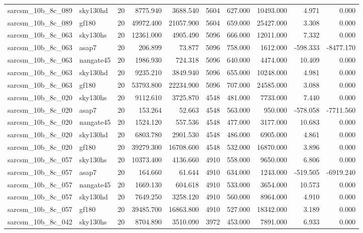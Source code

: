 \documentclass{article}
\begin{document}
\begin{longtable}{llrrrrrrrr}
sarcsm\_10b\_8c\_089 & sky130hd & 20 & 8775.940 & 3688.540 & 5604 & 627.000 & 10493.000 & 4.971 & 0.000 \\
sarcsm\_10b\_8c\_089 & gf180 & 20 & 49972.400 & 21057.900 & 5604 & 659.000 & 25427.000 & 3.308 & 0.000 \\
sarcsm\_10b\_8c\_063 & sky130hs & 20 & 12361.000 & 4905.490 & 5096 & 666.000 & 12011.000 & 7.332 & 0.000 \\
sarcsm\_10b\_8c\_063 & asap7 & 20 & 206.899 & 73.877 & 5096 & 758.000 & 1612.000 & -598.333 & -8477.170 \\
sarcsm\_10b\_8c\_063 & nangate45 & 20 & 1986.930 & 724.318 & 5096 & 640.000 & 4474.000 & 10.409 & 0.000 \\
sarcsm\_10b\_8c\_063 & sky130hd & 20 & 9235.210 & 3849.940 & 5096 & 655.000 & 10248.000 & 4.981 & 0.000 \\
sarcsm\_10b\_8c\_063 & gf180 & 20 & 53793.800 & 22234.900 & 5096 & 707.000 & 24585.000 & 3.088 & 0.000 \\
sarcsm\_10b\_8c\_020 & sky130hs & 20 & 9112.610 & 3725.870 & 4548 & 481.000 & 7733.000 & 7.440 & 0.000 \\
sarcsm\_10b\_8c\_020 & asap7 & 20 & 153.264 & 52.663 & 4548 & 563.000 & 950.000 & -578.058 & -7711.560 \\
sarcsm\_10b\_8c\_020 & nangate45 & 20 & 1524.120 & 557.536 & 4548 & 477.000 & 3177.000 & 10.683 & 0.000 \\
sarcsm\_10b\_8c\_020 & sky130hd & 20 & 6803.780 & 2901.530 & 4548 & 486.000 & 6905.000 & 4.861 & 0.000 \\
sarcsm\_10b\_8c\_020 & gf180 & 20 & 39279.300 & 16708.600 & 4548 & 532.000 & 16870.000 & 3.896 & 0.000 \\
sarcsm\_10b\_8c\_057 & sky130hs & 20 & 10373.400 & 4136.660 & 4910 & 558.000 & 9650.000 & 6.806 & 0.000 \\
sarcsm\_10b\_8c\_057 & asap7 & 20 & 164.660 & 61.644 & 4910 & 634.000 & 1243.000 & -519.505 & -6919.240 \\
sarcsm\_10b\_8c\_057 & nangate45 & 20 & 1669.130 & 604.618 & 4910 & 533.000 & 3654.000 & 10.573 & 0.000 \\
sarcsm\_10b\_8c\_057 & sky130hd & 20 & 7649.250 & 3258.120 & 4910 & 560.000 & 8964.000 & 4.910 & 0.000 \\
sarcsm\_10b\_8c\_057 & gf180 & 20 & 39485.700 & 16863.800 & 4910 & 527.000 & 18342.000 & 3.189 & 0.000 \\
sarcsm\_10b\_8c\_042 & sky130hs & 20 & 8704.890 & 3510.090 & 3972 & 453.000 & 7891.000 & 6.933 & 0.000 \\

\end{longtable}
\end{document}
